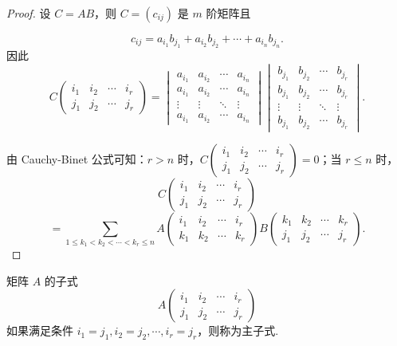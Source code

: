 \begin{proof}
    设 $C = AB$，则 $C = (c_{ij})$ 是 $m$ 阶矩阵且

    \[ c_{ij} = a_{i_1} b_{j_1} + a_{i_2} b_{j_2} + \cdots + a_{i_n} b_{j_n}. \]
    因此
    \[
    C
    \begin{pmatrix}
        i_1 & i_2 & \cdots & i_r \\
        j_1 & j_2 & \cdots & j_r
    \end{pmatrix}
    =
    \begin{vmatrix}
        a_{i_1} & a_{i_2} & \cdots & a_{i_n} \\
        a_{i_1} & a_{i_2} & \cdots & a_{i_n} \\
        \vdots & \vdots & \ddots & \vdots \\
        a_{i_1} & a_{i_2} & \cdots & a_{i_n}
    \end{vmatrix}
    \begin{vmatrix}
        b_{j_1} & b_{j_2} & \cdots & b_{j_r} \\
        b_{j_1} & b_{j_2} & \cdots & b_{j_r} \\
        \vdots & \vdots & \ddots & \vdots \\
        b_{j_1} & b_{j_2} & \cdots & b_{j_r}
    \end{vmatrix}.
    \]

    由 Cauchy-Binet 公式可知：$r > n$ 时，$C
    \begin{pmatrix}
        i_1 & i_2 & \cdots & i_r \\
        j_1 & j_2 & \cdots & j_r
    \end{pmatrix} = 0$；当 $r \leqslant n$ 时，
    \[
    C
    \begin{pmatrix}
        i_1 & i_2 & \cdots & i_r \\
        j_1 & j_2 & \cdots & j_r
    \end{pmatrix} \]
    \[ =\sum_{1 \leqslant k_1 < k_2 < \cdots < k_r \leqslant n} A
    \begin{pmatrix}
        i_1 & i_2 & \cdots & i_r \\
        k_1 & k_2 & \cdots & k_r
    \end{pmatrix}
    B
    \begin{pmatrix}
        k_1 & k_2 & \cdots & k_r \\
        j_1 & j_2 & \cdots & j_r
    \end{pmatrix}. \]
\end{proof}

矩阵 $A$ 的子式
\[ A
\begin{pmatrix}
    i_1 & i_2 & \cdots & i_r \\
    j_1 & j_2 & \cdots & j_r
\end{pmatrix} \]
如果满足条件 $i_1 = j_1, i_2 = j_2, \cdots, i_r = j_r$，则称为主子式.

